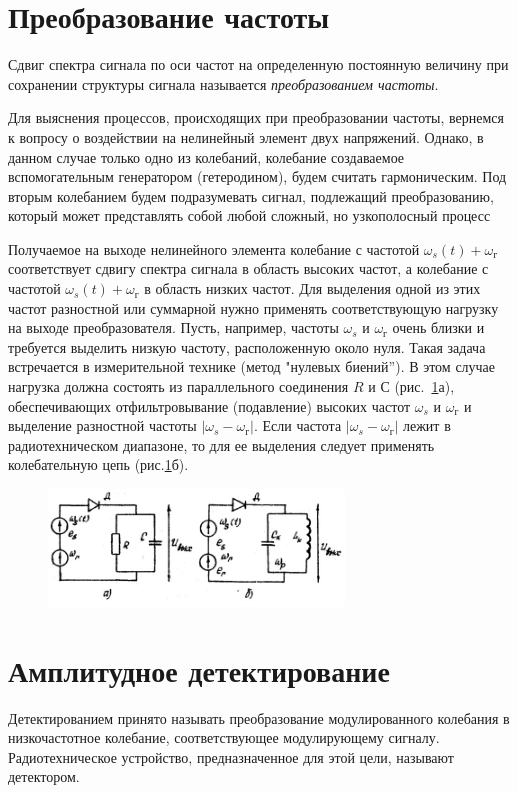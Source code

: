\section{Преобразование частоты}
Сдвиг спектра сигнала по оси частот на определенную постоянную величину при сохранении структуры сигнала называется \textit{преобразованием частоты}.

Для выяснения процессов, происходящих при преобразовании частоты, вернемся к вопросу о воздействии на нелинейный элемент двух напряжений. Однако, в данном случае только одно из колебаний, колебание создаваемое вспомогательным генератором (гетеродином), будем считать гармоническим. Под вторым колебанием
будем подразумевать сигнал, подлежащий преобразованию, который может представлять собой любой сложный, но узкополосный процесс

Получаемое на выходе нелинейного элемента колебание с частотой $\omega_s(t)+\omega_{\text{г}}$ соответствует сдвигу спектра сигнала в область высоких частот, а колебание с частотой $\omega_s(t)+\omega_{\text{г}}$ в область низких частот. Для выделения одной из этих частот разностной или суммарной нужно применять соответствующую нагрузку на выходе преобразователя. Пусть, например, частоты $\omega_s$ и $\omega_{\text{г}}$ очень близки и требуется выделить низкую частоту, расположенную около нуля. Такая задача встречается в измерительной технике (метод "нулевых биений”). В этом случае нагрузка должна состоять из параллельного соединения $R$ и $С$ (рис.~\ref{pic:7}а), обеспечивающих отфильтровывание (подавление) высоких частот $\omega_s$ и $\omega_{\text{г}}$ и выделение разностной частоты $|\omega_s - \omega_{\text{г}}|$. Если частота	$|\omega_s - \omega_{\text{г}}|$ лежит в радиотехническом диапазоне, то для ее выделения следует применять колебательную цепь (рис.\ref{pic:7}б).
\begin{figure}[h!]
	\centering
	\includegraphics[width=0.7\textwidth]{picture/pic7.jpg}
	\caption{}
	\label{pic:7}
\end{figure}
\section{Амплитудное детектирование}
Детектированием принято называть преобразование модулированного колебания в
низкочастотное колебание, соответствующее модулирующему сигналу. Радиотехническое устройство, предназначенное для этой цели, называют детектором.


